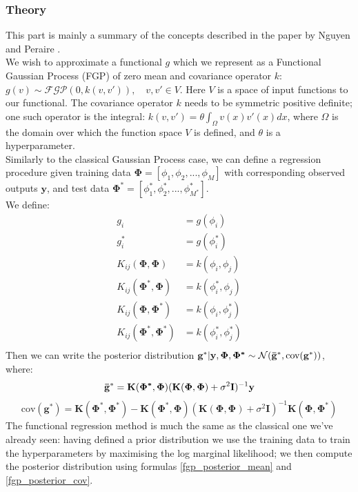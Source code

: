 \documentclass[a4paper,12pt]{article}
\begin{document}
\subsubsection{Theory}
This part is mainly a summary of the concepts described in the paper by Nguyen and Peraire \cite{fgp_paper}.\\
We wish to approximate a functional $g$ which we represent as a Functional Gaussian Process (FGP) of zero mean and covariance operator $k$: $g(v) \sim \mathcal{FGP}(0, k(v,v')), \quad v, v' \in V$. Here $V$ is a space of input functions to our functional. The covariance operator $k$ needs to be symmetric positive definite; one such operator is the integral: $k(v,v') = \theta \int_\Omega v(x) v'(x) dx$, where $\Omega$ is the domain over which the function space $V$ is defined, and $\theta$ is a hyperparameter.\\
Similarly to the classical Gaussian Process case, we can define a regression procedure given training data $\boldsymbol{\Phi} = [\phi_1, \phi_2, ..., \phi_M]$ with corresponding observed outputs $\mathbf{y}$, and test data $\boldsymbol{\Phi^*} = [\phi^*_1, \phi^*_2, ..., \phi^*_{M^*}]$.\\
We define:
\begin{equation}
\begin{aligned}
  g_i &= g(\phi_i)\\
  g^*_i &= g(\phi_i^*)\\
  K_{ij}(\boldsymbol{\Phi}, \boldsymbol{\Phi}) &= k(\phi_i,\phi_j)\\
  K_{ij}(\boldsymbol{\Phi^*}, \boldsymbol{\Phi}) &= k(\phi^*_i,\phi_j)\\
  K_{ij}(\boldsymbol{\Phi}, \boldsymbol{\Phi^*}) &= k(\phi_i,\phi^*_j)\\
  K_{ij}(\boldsymbol{\Phi^*}, \boldsymbol{\Phi^*}) &= k(\phi^*_i,\phi^*_j)\\
\end{aligned}
\end{equation}
Then we can write the posterior distribution $\mathbf{g^*}|\mathbf{y},\boldsymbol{\Phi},\boldsymbol{\Phi^*} \sim \mathcal{N}(\mathbf{\Bar{g}^*}, \text{cov}(\mathbf{g^*}))$, where:
\begin{equation}
\label{fgp_posterior_mean}
    \mathbf{\Bar{g}^*} = \mathbf{K}(\boldsymbol{\Phi^*}, \boldsymbol{\Phi})(\mathbf{K}(\boldsymbol{\Phi}, \boldsymbol{\Phi}) + \sigma^2 \mathbf{I})^{-1}\mathbf{y}
\end{equation}
\begin{equation}
\label{fgp_posterior_cov}
    \text{cov}(\mathbf{g^*}) = \mathbf{K}(\boldsymbol{\Phi^*}, \boldsymbol{\Phi^*}) - \mathbf{K}(\boldsymbol{\Phi^*}, \boldsymbol{\Phi})(\mathbf{K}(\boldsymbol{\Phi}, \boldsymbol{\Phi}) + \sigma^2 \mathbf{I})^{-1}\mathbf{K}(\boldsymbol{\Phi}, \boldsymbol{\Phi^*})
\end{equation}
The functional regression method is much the same as the classical one we've already seen: having defined a prior distribution we use the training data to train the hyperparameters by maximising the log marginal likelihood; we then compute the posterior distribution using formulas \ref{fgp_posterior_mean} and \ref{fgp_posterior_cov}.
\end{document}
